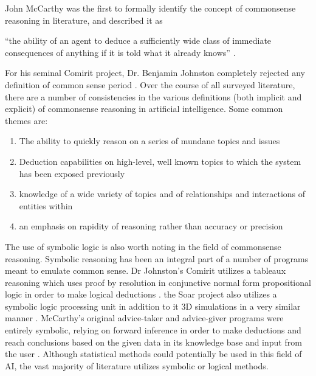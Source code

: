 John McCarthy was the first to formally identify the concept of commonsense reasoning in literature, and described it as 

\begin{center}
 ``the ability of an agent to deduce a sufficiently wide class of immediate consequences of anything if it is told what it already knows'' \cite{mccarthy1963programs}.
\end{center}
  
For his seminal Comirit project, Dr. Benjamin Johnston completely rejected any definition of common sense period \cite{johnston2008comirit}. 
Over the course of all surveyed literature, there are a number of consistencies in the various definitions (both implicit and explicit) of commonsense reasoning in artificial intelligence. 
Some common themes are:
\begin{center}
\begin{enumerate}
	\item The ability to quickly reason on a series of mundane topics and issues
	
	\item Deduction capabilities on high-level, well known topics to which the system has been exposed previously
	
	\item knowledge of a wide variety of topics and of relationships and interactions of entities within
	
	\item an emphasis on rapidity of reasoning rather than accuracy or precision
\end{enumerate}
\end{center}

The use of symbolic logic is also worth noting in the field of commonsense reasoning. Symbolic reasoning has been an integral part of a number of programs meant to emulate common sense. Dr Johnston's Comirit utilizes a tableaux reasoning which uses proof by resolution in conjunctive normal form propositional logic in order to make logical deductions \cite{johnston2008comirit,johnston2009practical}. the Soar project also utilizes a symbolic logic processing unit in addition to it 3D simulations in a very similar manner \cite{wintermute2009overview}. McCarthy's original advice-taker and advice-giver programs were entirely symbolic, relying on forward inference in order to make deductions and reach conclusions based on the given data in its knowledge base and input from the user \cite{mccarthy1963programs}.
Although statistical methods could potentially be used in this field of AI, the vast majority of literature utilizes symbolic or logical methods.

